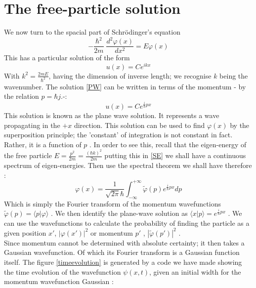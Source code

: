   \section{The free-particle solution}
  We now turn to the spacial part of Schr\"{o}dinger's equation
  \begin{equation}
  - \frac{\hbar ^2}{2 m }\; \dfrac{d^2 \varphi{(x)}}{dx^2} = E \varphi(x)
  \label{sch}
  \end{equation}
  This has a particular solution of the form
  \begin{equation}
  u(x) = C e^{i kx}
  \label{PW}
  \end{equation}
  With $ k^2 = \frac{ 2mE}{\hbar^2}$, having the dimension of inverse length; we recognise $ k$ being the wavenumber. The solution \eqref{PW} can be written in terms of the momentum - by the relation $ p = \hbar j$.-:
  \begin{equation}
  u(x) = C e^{\frac{i}{\hbar} p x}
  \label{PWp}
  \end{equation}
  This solution is known as the plane wave solution. It represents a wave propagating in the $ +x$ direction. This solution can be used to find $ \varphi(x)$ by the superposition principle; the 'constant' of integration is not constant in fact. Rather, it is a function of $ p$ . In order to see this, recall that the eigen-energy of the free particle $ E = \frac{p^2}{2m}=  \frac{(\hbar k)^2}{2m}$ putting this in \eqref{SE} we shall have a continuous spectrum of eigen-energies. Then use the spectral theorem we shall have therefore :
  \begin{equation}
  \varphi(x) = \frac{1}{\sqrt{2 \pi} \hbar} \int_{- \infty}^{+ \infty} \tilde{\varphi}(p) e^{\frac{i}{\hbar} p x} dp 
  \label{packet}
  \end{equation} 
  Which is simply the  Fourier transform of the momentum wavefunctions $ \tilde{\varphi}(p)  = \langle p | \varphi \rangle $ . We then identify the plane-wave solution as $ \langle x|p \rangle = e^{\frac{i}{\hbar} p x}$ . We can use the wavefunctions to calculate the probability of finding the particle as a given position $ x'$,  $ | \varphi(x')| ^2$ or momentum $ p'$ ,   $ | \tilde{\varphi}(p')| ^2$ . \\
  Since momentum cannot be determined with absolute certainty; it then takes a Gaussian wavefunction. Of which its Fourier transform is a Gaussian function itself. The figure \ref{timeevolution} is generated by a code we have made showing the time evolution of the wavefunction $ \psi (x,t)$, given an initial width for the momentum wavefunction Gaussian :
